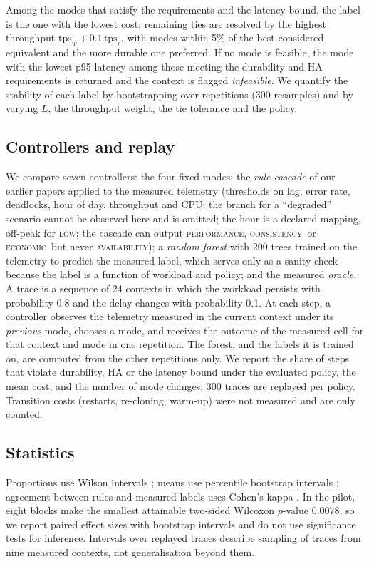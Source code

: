 \documentclass[smallextended]{svjour3}
\newcommand{\perf}{\textsc{performance}}
\newcommand{\cons}{\textsc{consistency}}
\newcommand{\avail}{\textsc{availability}}
\newcommand{\econ}{\textsc{economic}}
\begin{document}
Among the modes that satisfy the requirements and the latency bound, the label is the one with the lowest cost; remaining ties are resolved by the highest throughput $\text{tps}_w+0.1\,\text{tps}_r$, with modes within 5\% of the best considered equivalent and the more durable one preferred. If no mode is feasible, the mode with the lowest p95 latency among those meeting the durability and HA requirements is returned and the context is flagged \emph{infeasible}. We quantify the stability of each label by bootstrapping over repetitions (300 resamples) and by varying $L$, the throughput weight, the tie tolerance and the policy.

\subsection{Controllers and replay}\label{sec:replay}
We compare seven controllers: the four fixed modes; the \emph{rule cascade} of our earlier papers applied to the measured telemetry (thresholds on lag, error rate, deadlocks, hour of day, throughput and CPU; the branch for a ``degraded'' scenario cannot be observed here and is omitted; the hour is a declared mapping, off-peak for \textsc{low}; the cascade can output \perf, \cons\ or \econ\ but never \avail); a \emph{random forest} \cite{breiman2001} with 200 trees trained on the telemetry to predict the measured label, which serves only as a sanity check because the label is a function of workload and policy; and the measured \emph{oracle}. A trace is a sequence of 24 contexts in which the workload persists with probability 0.8 and the delay changes with probability 0.1. At each step, a controller observes the telemetry measured in the current context under its \emph{previous} mode, chooses a mode, and receives the outcome of the measured cell for that context and mode in one repetition. The forest, and the labels it is trained on, are computed from the other repetitions only. We report the share of steps that violate durability, HA or the latency bound under the evaluated policy, the mean cost, and the number of mode changes; 300 traces are replayed per policy. Transition costs (restarts, re-cloning, warm-up) were not measured and are only counted.

\subsection{Statistics}\label{sec:stats}
Proportions use Wilson intervals \cite{wilson1927}; means use percentile bootstrap intervals \cite{efron1979}; agreement between rules and measured labels uses Cohen's kappa \cite{cohen1960}. In the pilot, eight blocks make the smallest attainable two-sided Wilcoxon $p$-value 0.0078, so we report paired effect sizes with bootstrap intervals and do not use significance tests for inference. Intervals over replayed traces describe sampling of traces from nine measured contexts, not generalisation beyond them.
\end{document}
